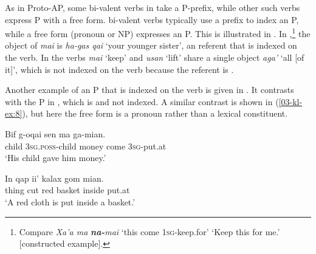 \documentclass[output=paper]{LSP/langsci}
\begin{document}
As in Proto-AP, some bi-valent verbs in  take a P-prefix, while other such verbs express P with a free form.  bi-valent verbs typically use a prefix to index an  P, while a free form (pronoun or NP) expresses an  P. This is illustrated in . In ,\footnote{Compare \textit{Xa’a ma} \textbf{\textit{na-}}\textit{mai} ‘this come 1\textsc{sg}-keep.for’ ‘Keep this for me.’ [constructed example].} the object of \textit{mai} is \textit{ha-gas qai} ‘your younger sister’, an  referent that is indexed on the verb. In  the verbs \textit{mai} ‘keep’ and \textit{usan} ‘lift’ share a single object \textit{aga’} ‘all [of it]’, which is not indexed on the verb because the referent is .


Another example of an  P that is indexed on the verb is given
in . It contrasts with the P in , which is  and not indexed. A similar contrast is shown in (\ref{03-kl-ex:8}), but here the free form is a pronoun rather than a lexical constituent.

\ea \label{03-kl-ex:7}
\ea
\label{03-kl-ex:7a}
\gll Bif g-oqai sen ma ga-mian.\\
child 3\textsc{sg}.\textsc{poss}-child money come 3\textsc{sg}-put.at\\
\glt ‘His child gave him money.’

\ex
\label{03-kl-ex:7b}
\gll In qap ii’ kalax gom mian.\\
thing cut red basket inside put.at\\
\glt ‘A red cloth is put inside a basket.’
\z
\z

\end{document}
